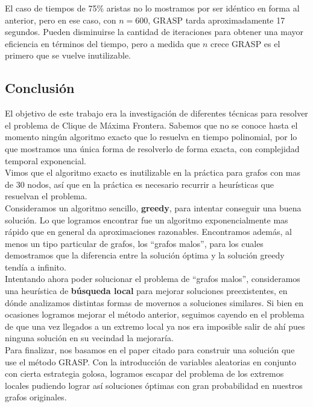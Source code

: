 El caso de tiempos de 75\% aristas no lo mostramos por ser idéntico en forma al anterior, pero en ese caso, con $n = 600$, GRASP tarda aproximadamente 17 segundos. Pueden disminuirse la cantidad de iteraciones para obtener una mayor eficiencia en términos del tiempo, pero a medida que $n$ crece GRASP es el primero que se vuelve inutilizable.



\subsection{Conclusión}

El objetivo de este trabajo era la investigación de diferentes técnicas para resolver el problema de Clique de Máxima Frontera. Sabemos que no se conoce hasta el momento ningún algoritmo exacto que lo resuelva en tiempo polinomial, por lo que mostramos una única forma de resolverlo de forma exacta, con complejidad temporal exponencial. \\

Vimos que el algoritmo exacto es inutilizable en la práctica para grafos con mas de 30 nodos, así que en la práctica es necesario recurrir a heurísticas que resuelvan el problema. \\

Consideramos un algoritmo sencillo, \textbf{greedy}, para intentar conseguir una buena solución. Lo que logramos encontrar fue un algoritmo exponencialmente mas rápido que en general da aproximaciones razonables. Encontramos además, al menos un tipo particular de grafos, los ``grafos malos'', para los cuales demostramos que la diferencia entre la solución óptima y la solución greedy tendía a infinito. \\

Intentando ahora poder solucionar el problema de ``grafos malos'', consideramos una heurística de \textbf{búsqueda local} para mejorar soluciones preexistentes, en dónde analizamos distintas formas de movernos a soluciones similares. Si bien en ocasiones logramos mejorar el método anterior, seguimos cayendo en el problema de que una vez llegados a un extremo local ya nos era imposible salir de ahí pues ninguna solución en su vecindad la mejoraría. \\

Para finalizar, nos basamos en el paper citado \cite{paper_grasp} para construir una solución que use el método GRASP. Con la introducción de variables aleatorias en conjunto con cierta estrategia golosa, logramos escapar del problema de los extremos locales pudiendo lograr así soluciones óptimas con gran probabilidad en nuestros grafos originales. \\

